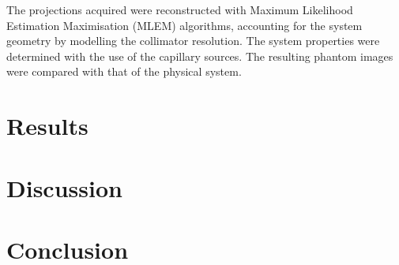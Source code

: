 The projections acquired were reconstructed with Maximum Likelihood Estimation Maximisation (MLEM) algorithms, accounting for the system geometry by modelling the collimator resolution. The system properties were determined with the use of the capillary sources. The resulting phantom images were compared with that of the physical system.  

\section{Results}

\section{Discussion}

\section{Conclusion}
